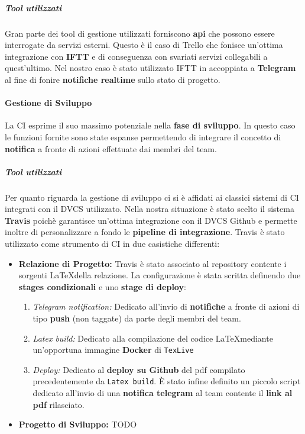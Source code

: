 \subparagraph{Tool utilizzati}
Gran parte dei tool di gestione utilizzati forniscono \textbf{api} che possono essere interrogate da servizi esterni. Questo è il caso di Trello che fonisce un'ottima integrazione con \textbf{IFTT} e di conseguenza con svariati servizi collegabili a quest'ultimo. Nel nostro caso è stato utilizzato IFTT in accoppiata a \textbf{Telegram} al fine di fonire \textbf{notifiche realtime} sullo stato di progetto.


\paragraph{Gestione di Sviluppo}
La CI esprime il suo massimo potenziale nella \textbf{fase di sviluppo}. In questo caso le funzioni fornite sono state espanse permettendo di integrare il concetto di \textbf{notifica} a fronte di azioni effettuate dai membri del team.

\subparagraph{Tool utilizzati}
Per quanto riguarda la gestione di sviluppo ci si è affidati ai classici sistemi di CI integrati con il DVCS utilizzato. Nella nostra situazione è stato scelto il sistema \textbf{Travis} poichè garantisce un'ottima integrazione con il DVCS Github e permette inoltre di personalizzare a fondo le \textbf{pipeline di integrazione}. Travis è stato utilizzato come strumento di CI in due casistiche differenti: 
\begin{itemize}
	\item{\textbf{Relazione di Progetto:}}
	Travis è stato associato al repository contente i sorgenti \LaTeX della relazione. La configurazione è stata scritta definendo due \textbf{stages condizionali} e uno \textbf{stage di deploy}:
	\begin{enumerate}
	 	\item{\textit{Telegram notification:}}
	 	Dedicato all'invio di \textbf{notifiche} a fronte di azioni di tipo \textbf{push} (non taggate) da parte degli membri del team.
	 	\item{\textit{Latex build:}}
	 	Dedicato alla compilazione del codice \LaTeX mediante un'opportuna immagine \textbf{Docker} di \texttt{TexLive}  
	 	\item{\textit{Deploy:}}
	 	Dedicato al \textbf{deploy su Github} del pdf compilato precedentemente da \texttt{Latex build}. È stato infine definito un piccolo script dedicato all'invio di una \textbf{notifica telegram} al team contente il \textbf{link al pdf} rilasciato.
	 \end{enumerate}
	 \item{\textbf{Progetto di Sviluppo:}}
	 \huge TODO
\end{itemize}









